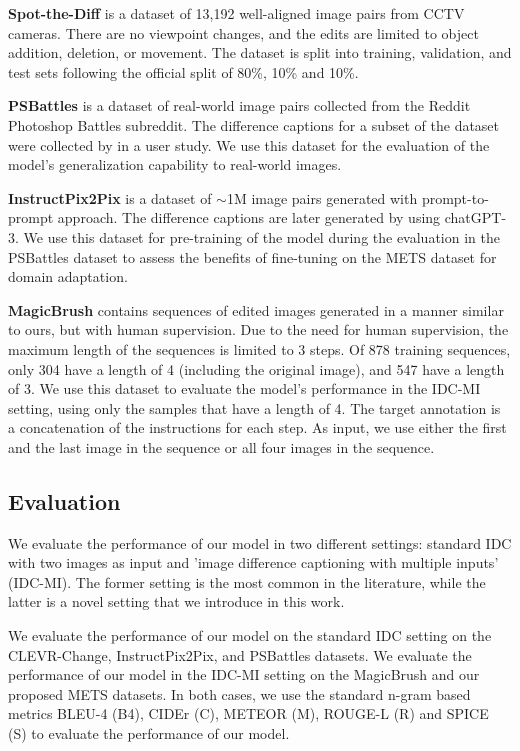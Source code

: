 \documentclass[10pt,twocolumn,letterpaper]{article}
\begin{document}
\noindent\textbf{Spot-the-Diff} \cite{spot-the-diff} is a dataset of 13,192 well-aligned
image pairs from CCTV cameras. There are no viewpoint changes, and the edits are
limited to object addition, deletion, or movement. The dataset is split into 
training, validation, and test sets following the official split of 80\%, 10\% and 10\%.

\noindent\textbf{PSBattles} \cite{psbattles} is a dataset of real-world image
pairs collected from the Reddit Photoshop Battles subreddit. The difference
captions for a subset of the dataset were collected by \cite{vixen} in a user
study. We use this dataset for the evaluation of the model's generalization
capability to real-world images.

\noindent\textbf{InstructPix2Pix} \cite{ip2p} is a dataset of $\sim$1M image
pairs generated with prompt-to-prompt \cite{p2p} approach. The
difference captions are later generated by \cite{vixen} using chatGPT-3. We use
this dataset for pre-training of the model during the evaluation in the PSBattles
dataset to assess the benefits of fine-tuning on the METS dataset for domain
adaptation.

\noindent\textbf{MagicBrush} \cite{magicbrush} contains sequences of edited images
generated in a manner similar to ours, but with human supervision. Due to the
need for human supervision, the maximum length of the sequences is limited to
3 steps. Of 878 training sequences, only 304 have a length of 4 (including the original image), and 547 have 
a length of 3. We use this dataset to evaluate the model's performance in the
IDC-MI setting, using only the samples that have a length of 4. The target annotation
is a concatenation of the instructions for each step. As input, we use either
the first and the last image in the sequence or all four images in the sequence.

\subsection{Evaluation}

We evaluate the performance of our model in two different settings: standard IDC
with two images as input
and 'image difference captioning with multiple inputs' (IDC-MI). The former
setting is the most common in the literature, while the latter is a novel
setting that we introduce in this work. 

We evaluate the performance of our
model on the standard IDC setting on the CLEVR-Change, InstructPix2Pix, and
PSBattles datasets. We evaluate the performance of our model in the IDC-MI
setting on the MagicBrush and our proposed METS datasets. In both cases, we use
the standard n-gram based metrics BLEU-4 (B4), CIDEr (C),
METEOR (M), ROUGE-L (R) and SPICE (S) to evaluate the performance of our model. 
\end{document}
